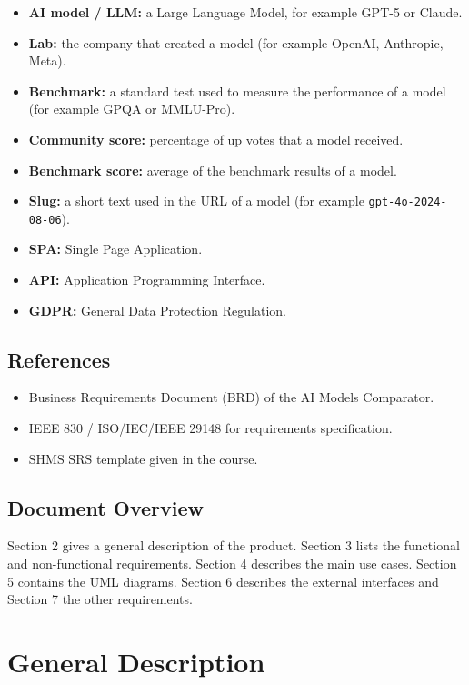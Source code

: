 \documentclass[11pt,a4paper]{article}
\newcommand{\product}{AI Models Comparator}
\begin{document}
\begin{itemize}
  \item \textbf{AI model / LLM:} a Large Language Model, for example GPT-5 or Claude.
  \item \textbf{Lab:} the company that created a model (for example OpenAI, Anthropic, Meta).
  \item \textbf{Benchmark:} a standard test used to measure the performance of a model (for example GPQA or MMLU-Pro).
  \item \textbf{Community score:} percentage of up votes that a model received.
  \item \textbf{Benchmark score:} average of the benchmark results of a model.
  \item \textbf{Slug:} a short text used in the URL of a model (for example \texttt{gpt-4o-2024-08-06}).
  \item \textbf{SPA:} Single Page Application.
  \item \textbf{API:} Application Programming Interface.
  \item \textbf{GDPR:} General Data Protection Regulation.
\end{itemize}

\subsection{References}

\begin{itemize}
  \item Business Requirements Document (BRD) of the \product{}.
  \item IEEE 830 / ISO/IEC/IEEE 29148 for requirements specification.
  \item SHMS SRS template given in the course.
\end{itemize}

\subsection{Document Overview}

Section 2 gives a general description of the product. Section 3 lists the functional and non-functional requirements. Section 4 describes the main use cases. Section 5 contains the UML diagrams. Section 6 describes the external interfaces and Section 7 the other requirements.

\section{General Description}
\end{document}
